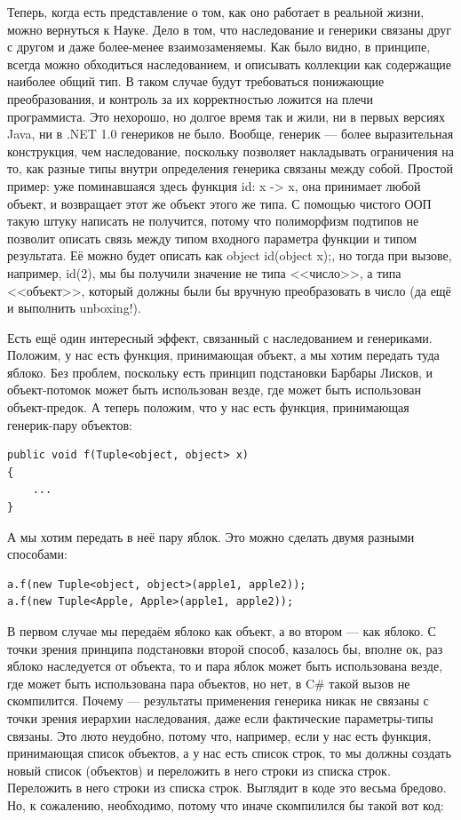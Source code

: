 \documentclass[a5paper]{article}
\begin{document}
Теперь, когда есть представление о том, как оно работает в реальной жизни, можно вернуться к Науке. Дело в том, что наследование и генерики связаны друг с другом и даже более-менее взаимозаменяемы. Как было видно, в принципе, всегда можно обходиться наследованием, и описывать коллекции как содержащие наиболее общий тип. В таком случае будут требоваться понижающие преобразования, и контроль за их корректностью ложится на плечи программиста. Это нехорошо, но долгое время так и жили, ни в первых версиях Java, ни в .NET 1.0 генериков не было. Вообще, генерик --- более выразительная конструкция, чем наследование, поскольку позволяет накладывать ограничения на то, как разные типы внутри определения генерика связаны между собой. Простой пример: уже поминавшаяся здесь функция id: x -> x, она принимает любой объект, и возвращает этот же объект этого же типа. С помощью чистого ООП такую штуку написать не получится, потому что полиморфизм подтипов не позволит описать связь между типом входного параметра функции и типом результата. Её можно будет описать как object id(object x);, но тогда при вызове, например, id(2), мы бы получили значение не типа <<число>>, а типа <<объект>>, который должны были бы вручную преобразовать в число (да ещё и выполнить unboxing!).

Есть ещё один интересный эффект, связанный с наследованием и генериками. Положим, у нас есть функция, принимающая объект, а мы хотим передать туда яблоко. Без проблем, поскольку есть принцип подстановки Барбары Лисков, и объект-потомок может быть использован везде, где может быть использован объект-предок. А теперь положим, что у нас есть функция, принимающая генерик-пару объектов:

\begin{verbatim}
public void f(Tuple<object, object> x)
{
    ...
}
\end{verbatim}

А мы хотим передать в неё пару яблок. Это можно сделать двумя разными способами:

\begin{verbatim}
a.f(new Tuple<object, object>(apple1, apple2));
a.f(new Tuple<Apple, Apple>(apple1, apple2));
\end{verbatim}

В первом случае мы передаём яблоко как объект, а во втором --- как яблоко. С точки зрения принципа подстановки второй способ, казалось бы, вполне ок, раз яблоко наследуется от объекта, то и пара яблок может быть использована везде, где может быть использована пара объектов, но нет, в C\# такой вызов не скомпилится. Почему --- результаты применения генерика никак не связаны с точки зрения иерархии наследования, даже если фактические параметры-типы связаны. Это люто неудобно, потому что, например, если у нас есть функция, принимающая список объектов, а у нас есть список строк, то мы должны создать новый список (объектов) и переложить в него строки из списка строк. Переложить в него строки из списка строк. Выглядит в коде это весьма бредово. Но, к сожалению, необходимо, потому что иначе скомпилился бы такой вот код:
\end{document}
